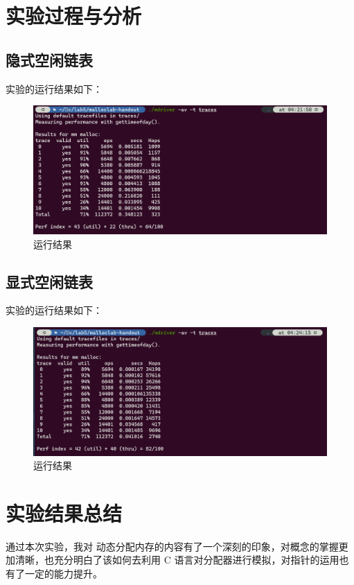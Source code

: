 \documentclass{article}
\begin{document}
\section{实验过程与分析}

\subsection{隐式空闲链表}
实验的运行结果如下：
\begin{figure}[H]
    \centering
    \includegraphics[width=15cm]{1.png}
    \caption{运行结果}
\end{figure}
\subsection{显式空闲链表}
实验的运行结果如下：
\begin{figure}[H]
    \centering
    \includegraphics[width=15cm]{2.png}
    \caption{运行结果}
\end{figure}


\normalsize
\section{实验结果总结}

通过本次实验，我对 动态分配内存的内容有了一个深刻的印象，对概念的掌握更加清晰，也充分明白了该如何去利用 C 语言对分配器进行模拟，对指针的运用也有了一定的能力提升。
\end{document}
